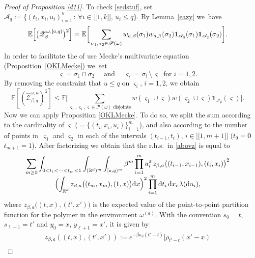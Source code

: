 \documentclass[JEP,XML,SOM,Unicode,published]{cedram}
\let\mathcal\mathscr
\newcommand{\lint}{\mathopen{[\![}}
\newcommand{\rint}{\mathclose{]\!]}}
\theoremstyle{definition}
\newcommand{\dd}{\mathrm{d}}
\newcommand{\ind}{\mathbf{1}}
\newcommand{\cA}{{\ensuremath{\mathcal A}} }
\newcommand{\cP}{{\ensuremath{\mathcal P}} }
\newcommand{\cZ}{{\ensuremath{\mathcal Z}} }
\newcommand{\bbE}{{\ensuremath{\mathbb E}} }
\newcommand{\bbR}{{\ensuremath{\mathbb R}} }
\let\gb\beta
\let\go\omega
\begin{document}
\begin{proof}[Proof of Proposition \ref{d11}]
To check \eqref{sedstuf}, set
$\cA_q:=\{ (t_i,x_i,u_i)^k_{i=1} \, : \, \forall i\in \lint 1,k\rint,\, u_i\le q \}$.
By Lemma~\ref{eazy} we~have
\begin{equation}
\bbE \Bigl[ \bigl(\cZ^{\go,[a,q)}_{\beta} \bigr)^2 \Bigr]= \bbE \bigg[ \sum_{\sigma_1, \sigma_2 \in \cP(\go)} w_{a,\beta}(\sigma_1)w_{a,\beta}(\sigma_2) \ind_{\cA_q}(\sigma_1)\ind_{\cA_q}(\sigma_2) \bigg].
\end{equation}
In order to facilitate the of use Mecke's multivariate equation (Proposition~\ref{OKLMecke}) we~set%
\begin{equation}\label{lanotat}
\varsigma=\sigma_1 \cap \sigma_2 \quad \text{ and } \quad \varsigma_i=\sigma_i\, \setminus\, \varsigma \ \text{ for } i=1,2.
\end{equation}
By removing the constraint that $u\leq q$ on $\varsigma_i$, $i=1,2$, we obtain
\begin{equation}\label{abovz}
\bbE \left[ (\hat \cZ^{\go,a}_{\beta,q})^2 \right]\le
\bbE \bigg[ \sum_{\varsigma_1, \varsigma_2, \varsigma\in \cP(\go) \text{ disjoints}} w(\varsigma_1\cup \varsigma)w(\varsigma_2\cup \varsigma) \ind_{\cA_q}(\varsigma) \bigg].
\end{equation}
Now we can apply
Proposition \ref{OKLMecke}. To do so, we split the sum according to the cardinality of $\varsigma$ ($=\{ (t_i,x_i,u_i)\}^m_{i=1}$), and also according to the number of points in~$\varsigma_1$ and $\varsigma_2$
in each of the intervals $(t_{i-1},t_i)$, $i\in\lint 1, m+1\rint$ ($t_0=0$ $t_{m+1}=1$).
After factorizing
we obtain that the r.h.s.\ in \eqref{abovz} is equal to\vspace*{-5pt}
\begin{multline}\label{zruc}
\sum_{m \ge 0} \int_{0<t_1<\dots<t_m<1} \int_{ (\bbR^d)^m} \int_{[a,q)^m} \gb^{m}
\prod_{i=1}^{m} u_i^2 \, z_{\beta,a}\bigl((t_{i-1},x_{i-1}), (t_{i},x_{i}) \bigr)^2
\\[-5pt]
\Bigl(\int_{\bbR^d} z_{\beta,a}\bigl((t_m,x_m), (1,x) \bigr) \dd x \Bigr)^2 \prod_{i=1}^m \dd t_i\, \dd x_i\, \lambda(\dd u_i),
\end{multline}
where $z_{\beta,a}\bigl((t,x), (t',x') \bigr)$ is the expected value of the point-to-point partition function for the polymer in the environment $\go^{(a)}$. With the convention $s_0=t$, $s_{\ell+1}=t'$ and $y_0=x$, $y_{\ell+1} =x'$, it is given by\vspace*{-5pt}
\begin{multline}\label{zruc2}
z_{\beta,a} ((t,x), (t',x'))
:= e^{ -\gb \kappa_a (t'-t)}
\bigg[ \rho_{t'-t}(x'-x)\\

\end{multline}
\end{proof}
\end{document}

